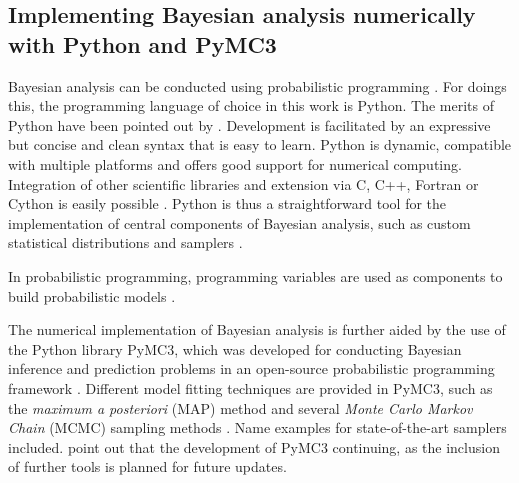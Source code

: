 		\subsection{Implementing Bayesian analysis numerically with Python and PyMC3}
		Bayesian analysis can be conducted using probabilistic programming \cite{salvatier2016pymc3}. For doings this, the programming language of choice in this work is Python. The merits of Python have been pointed out by \cite{behnel2010, salvatier2016pymc3, Langtangen2008}. Development is facilitated by an expressive but concise and clean syntax that is easy to learn. Python is dynamic, compatible with multiple platforms and offers good support for numerical computing. Integration of other scientific libraries and extension via C, C++, Fortran or Cython is easily possible \cite{behnel2010, salvatier2016pymc3, Langtangen2008}. Python is thus a straightforward tool for the implementation of central components of Bayesian analysis, such as custom statistical distributions and samplers \cite{salvatier2016pymc3}.
		
		In probabilistic programming, programming variables are used as components to build probabilistic models \cite{davidson2015}. 
		
		The numerical implementation of Bayesian analysis is further aided by the use of the Python library PyMC3, which was developed for conducting Bayesian inference and prediction problems in an open-source probabilistic programming framework \cite{davidson2015, salvatier2016pymc3}. Different model fitting techniques are provided in PyMC3, such as the \textit{maximum a posteriori} (MAP) method and several \textit{Monte Carlo Markov Chain} (MCMC) sampling methods \cite{salvatier2016pymc3}. 
		Name examples for state-of-the-art samplers included.
		\cite{salvatier2016pymc3} point out that the development of PyMC3 continuing, as the inclusion of further tools is planned for future updates.
		
